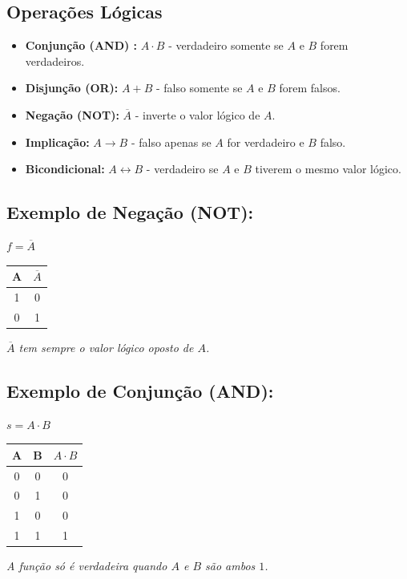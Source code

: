 \documentclass[12pt]{article}
\begin{document}
\subsection{Operações Lógicas}
\begin{itemize}
   \item \textbf{Conjunção (AND) :} \( A \cdot B \) - verdadeiro somente se \( A \) e \( B \) forem verdadeiros.
   \item \textbf{Disjunção (OR):} \( A + B \) - falso somente se \( A\) e \( B \) forem falsos.
   \item \textbf{Negação (NOT):} \( \overline{A} \) - inverte o valor lógico de \( A \).
   \item \textbf{Implicação:} \( A \rightarrow B \) - falso apenas se \( A \) for verdadeiro e \( B \) falso.
   \item \textbf{Bicondicional:} \( A \leftrightarrow B \) - verdadeiro se \( A \) e \( B \) tiverem o mesmo valor lógico.
\end{itemize}

\subsection*{Exemplo de Negação (\textbf{NOT}): }
$ f = \overline{A}$
\begin{center}
\begin{tabular}{|c|c|}
\hline
A & \( \overline{A} \) \\
\hline
1 & 0 \\
0 & 1 \\
\hline
\end{tabular}

\vspace{0.5em}
\textit{$\overline{A}$ tem sempre o valor lógico oposto de $A$.}
\end{center}

\subsection*{Exemplo de Conjunção (\textbf{AND}): }
$ s = A \cdot B$
\begin{center}
\begin{tabular}{|c|c|c|}
\hline
A & B & \( A \cdot B \) \\
\hline
0 & 0 & 0 \\
0 & 1 & 0 \\
1 & 0 & 0 \\
1 & 1 & 1 \\ 
\hline
\end{tabular}

\vspace{0.5em}
\textit{A função só é verdadeira quando $A$ e $B$ são ambos $1$.}
\end{center}
\end{document}
